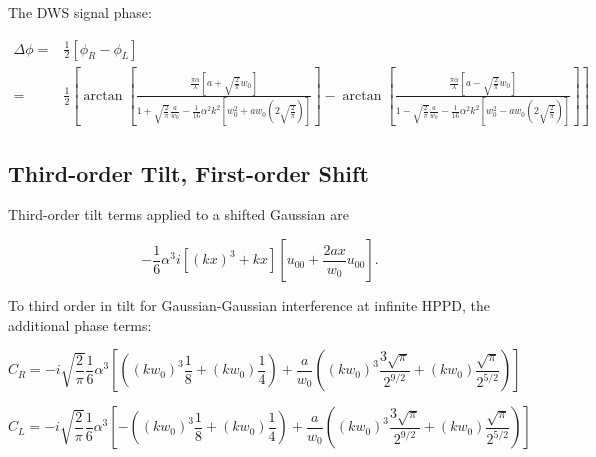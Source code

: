\documentclass[aps,twoside,secnumarabic,balancelastpage,amsmath,amssymb,nofootinbib,hyperref=pdftex]{revtex4}
\begin{document}
The DWS signal phase:

\begin{align*}
	\Delta \phi = &
		 \frac{1}{2} 
		 \left[
		 	\phi_R - \phi_L
		 \right]
		 \\ = &
		 \frac{1}{2}
		 \left[
							\arctan
				\left[
					\frac
					{ \frac{\pi \alpha}{\lambda}
					\left[
						a 
						+
						\sqrt{\frac{2}{\pi}} w_0
					\right]}					
				{1
				+
				 \sqrt{\frac{2}{\pi}} \frac{a}{w_0}
				 		-\frac{1}{16}\alpha^2 k^2 
	[
	 w_0^2
	+ 
	a w_0(
		2
	\sqrt{\frac{2}{\pi}}
	)
	]			 
				 }
				\right]
		-
			\arctan
				\left[
					\frac
					{ \frac{\pi \alpha}{\lambda}
					\left[
						a 
						-
						\sqrt{\frac{2}{\pi}} w_0
					\right]}					
				{1
				-
				 \sqrt{\frac{2}{\pi}} \frac{a}{w_0}
	-\frac{1}{16}
	\alpha^2 k^2 
	[
	 w_0^2
	- 
	a w_0(
			2
	\sqrt{\frac{2}{\pi}}
	)
	]			 
				 }
				\right]
			\right]							 	
\end{align*}

\clearpage

\subsection{Third-order Tilt, First-order Shift}

Third-order tilt terms applied to a shifted Gaussian are

\begin{equation}
-\frac{1}{6} \alpha^3 i [(kx)^3+kx]
[u_{00} + \frac{2ax}{w_0} u_{00}]
.
\end{equation}

To third order in tilt for Gaussian-Gaussian interference at infinite HPPD, the additional phase terms:

\begin{equation}
C_R=
    - i
    \sqrt{\frac{2}{\pi}}
    \frac{1}{6}
    \alpha^3
    [
        (
            (k w_0)^3 \frac{1}{8}
            +
            (k w_0) \frac {1}{4}
        )
        +
        \frac{a}{w_0}
        (
            (k w_0)^3 \frac{3 \sqrt{\pi}}{2^{9/2}}
            +
            (k w_0) \frac{\sqrt{\pi}}{2^{5/2}}
        )
    ]   
\end{equation}

\begin{equation}
C_L=
    - i
    \sqrt{\frac{2}{\pi}}
    \frac{1}{6}
    \alpha^3
    [
    -
        (
            (k w_0)^3 \frac{1}{8}
            +
            (k w_0) \frac {1}{4}
        )
        +
        \frac{a}{w_0}
        (
            (k w_0)^3 \frac{3 \sqrt{\pi}}{2^{9/2}}
            +
            (k w_0) \frac{\sqrt{\pi}}{2^{5/2}}
        )
    ]   
\end{equation}
\end{document}
